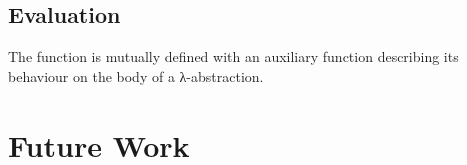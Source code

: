\documentclass{article}
\begin{document}





\subsection{Evaluation}




\begin{AgdaSuppressSpace}
\end{AgdaSuppressSpace}

The function  is mutually defined with an auxiliary
function describing its behaviour on the body of a λ-abstraction.

\begin{AgdaSuppressSpace}
\end{AgdaSuppressSpace}


\section{Future Work}

\cite{DBLP:journals/lisp/Coquand02}

\newpage
\printbibliography
\end{document}
